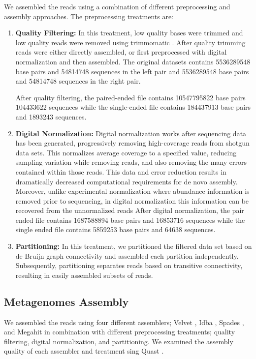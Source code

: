 We assembled the reads using a combination of different preprocessing and assembly approaches.  The preprocessing treatments are:
\begin{enumerate}
 \item {\bf Quality Filtering:} In this treatment, low quality bases were trimmed and low quality reads were removed using trimmomatic \cite{trimmomatic}. After quality trimming reads were either directly assembled, or first
 preprocessed with digital normalization and then assembled.
The original datasets contains  5536289548 base pairs  and 54814748 sequences in the  left pair and 5536289548 base pairs  and 54814748 sequences in the right pair. 

After quality filtering, the paired-ended file contains 10547795822  base pairs 104433622 sequences while the single-ended file contains  184437913 base pairs and 1893243 sequences. 

 \item {\bf Digital Normalization:} Digital normalization works after sequencing data has been generated, progressively
removing high-coverage reads from shotgun data sets. This normalizes average coverage to a
specified value, reducing sampling variation while removing reads, and also removing the many errors
contained within those reads. This data and error reduction results in dramatically decreased computational
requirements for de novo assembly. Moreover, unlike experimental normalization where abundance
information is removed prior to sequencing, in digital normalization this information can be recovered
from the unnormalized reads \cite{Brown2012}
After digital normalization, the pair ended file contains 1687588894 base pairs and 16853716 sequences  while the single ended file contains 5859253 base pairs and 64638 sequences. 

 \item {\bf Partitioning:} In this treatment,  we partitioned the filtered data set based on de Bruijn graph connectivity and assembled each partition independently.  Subsequently, partitioning
separates reads based on transitive connectivity, resulting in easily assembled subsets of
reads.
 
\end{enumerate}

\subsection*{Metagenomes Assembly}
We assembled the reads using four different assemblers; Velvet \cite{velvet}, Idba \cite{idba}, Spades \cite{spades}, and Megahit \cite{megahit} in combination with different preprocessing treatments;   quality filtering, digital normalization, and partitioning. We examined the assembly quality of each assembler and treatment sing Quast \cite{quast}. 

